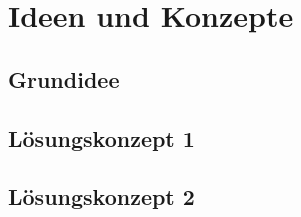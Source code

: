 \chapter{Ideen und Konzepte}

\section{Grundidee}

\section{Lösungskonzept 1}



\section{Lösungskonzept 2}


